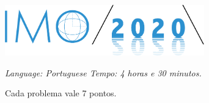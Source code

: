 \documentclass[10pt, a4paper]{article}
\title{}
\author{}
\begin{document}
	\includegraphics[height = 6em]{logo.png} \hfill {}

	\vspace{3em}

	\vspace{1em}

	\vfill

	\itshape 
	\noindent Language: Portuguese \hfill Tempo: 4 horas e 30 minutos.

								  \hfill Cada problema vale 7 pontos.
\end{document}
